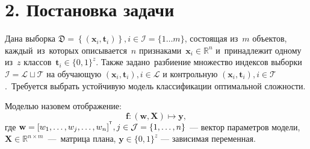 \documentclass[12pt]{article}
\begin{document}
\section{2. Постановка задачи}
Дана выборка $\mathfrak{D} =\left\{ (\mathbf{x}_i, \mathbf{t}_i) \right\}, i\in\mathcal{I}=\{1 \dots m\}$, состоящая из~$m$ объектов, каждый~из~которых описывается~$n$ признаками~$\mathbf{x}_i\in\mathbb{R}^n$ и~принадлежит одному из~$z$ классов~$\mathbf{t}_i\in\{0,1\}^z$. Также задано~разбиение множество индексов выборки $\mathcal{I} = \mathcal{L}\sqcup \mathcal {T}$ на обучающую ${(\mathbf{x}_i,\mathbf{t}_i)}, i \in \mathcal{L}$ и контрольную ${(\mathbf{x}_i,\mathbf{t}_i)}, i \in \mathcal{T}$.~Требуется выбрать устойчивую модель классификации оптимальной сложности.
\begin{Def}
Моделью назовем отображение:
\begin{equation*}
\mathbf{f} : (\mathbf{w},\mathbf{X}) \mapsto \mathbf{y},
\end{equation*}
где $\mathbf{w} = [w_1, \dots,w_j,\dots,w_n]^{^{\text{\tiny\sffamily\upshape\mdseries T}}}, j \in \mathcal{J} = \{1,\dots, n\}$ --- вектор параметров модели, $\mathbf{X} \in \mathbb{R}^{n\times m}$~---~матрица плана, $\mathbf{y} \in \{0,1\}^z$ --- зависимая переменная.
\end{Def}
\end{document}
